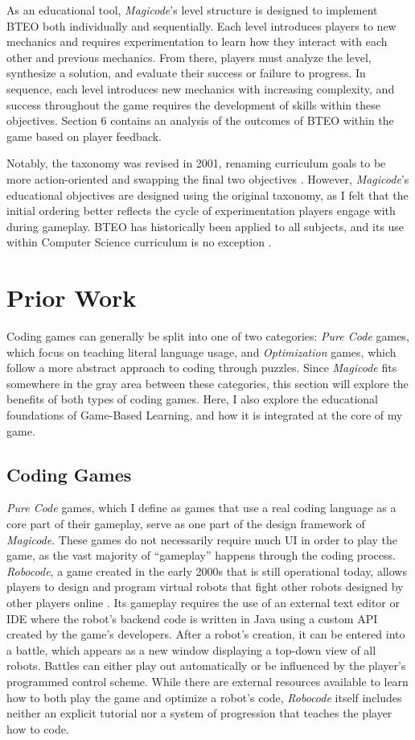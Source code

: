 \documentclass[10pt,twocolumn]{article}
\begin{document}
As an educational tool, \textit{Magicode}’s level structure is designed to implement BTEO both individually and sequentially. Each level introduces players to new mechanics and requires experimentation to learn how they interact with each other and previous mechanics. From there, players must analyze the level, synthesize a solution, and evaluate their success or failure to progress. In sequence, each level introduces new mechanics with increasing complexity, and success throughout the game requires the development of skills within these objectives. Section 6 contains an analysis of the outcomes of BTEO within the game based on player feedback. 

Notably, the taxonomy was revised in 2001, renaming curriculum goals to be more action-oriented and swapping the final two objectives \cite{revised-taxonomy}. However, \textit{Magicode}’s educational objectives are designed using the original taxonomy, as I felt that the initial ordering better reflects the cycle of experimentation players engage with during gameplay. BTEO has historically been applied to all subjects, and its use within Computer Science curriculum is no exception \cite{teaching-oop}.


\section{Prior Work}
Coding games can generally be split into one of two categories: \textit{Pure Code} games, which focus on teaching literal language usage, and \textit{Optimization} games, which follow a more abstract approach to coding through puzzles. Since \textit{Magicode} fits somewhere in the gray area between these categories, this section will explore the benefits of both types of coding games. Here, I also explore the educational foundations of Game-Based Learning, and how it is integrated at the core of my game.

\subsection{Coding Games}
\textit{Pure Code} games, which I define as games that use a real coding language as a core part of their gameplay, serve as one part of the design framework of \textit{Magicode}. These games do not necessarily require much UI in order to play the game, as the vast majority of “gameplay” happens through the coding process. \textit{Robocode}, a game created in the early 2000s that is still operational today, allows players to design and program virtual robots that fight other robots designed by other players online \cite{robocode}. Its gameplay requires the use of an external text editor or IDE where the robot’s backend code is written in Java using a custom API created by the game’s developers. After a robot’s creation, it can be entered into a battle, which appears as a new window displaying a top-down view of all robots. Battles can either play out automatically or be influenced by the player’s programmed control scheme. While there are external resources available to learn how to both play the game and optimize a robot’s code, \textit{Robocode} itself includes neither an explicit tutorial nor a system of progression that teaches the player how to code.
\end{document}
